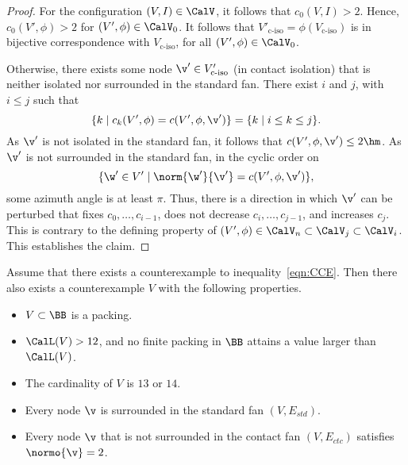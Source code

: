 \begin{proof}
For the configuration $(V,I)\in \CalV$, it follows that $c_0(V,I) >2$.
Hence, $c_0(V',\phi)>2$ for $(V',\phi)\in\CalV_0$.  It follows
that $V'_{\text{c-iso}}=\phi(V_{\text{c-iso}})$ is in bijective correspondence with
$V_{\text{c-iso}}$, for all $(V',\phi)\in \CalV_0$.

Otherwise, there exists some node $\v'\in V'_{\text{c-iso}}$ (in contact
isolation) that is neither isolated nor surrounded in the standard fan.
There exist $i$ and $j$, with $i\le j$ such that
\begin{displaymath}
\{k\mid c_k(V',\phi) = c(V',\phi,\v')\} = \{k\mid i\le k\le j\}.
\end{displaymath}
As $\v'$ is not isolated in the standard fan, it
follows that $c(V',\phi,\v') \le 2\hm$.  As $\v'$ is not surrounded in the
standard fan, in the cyclic order on
\begin{displaymath}
\{\w'\in V' \mid \norm{\w'}{\v'} = c(V',\phi,\v')\},
\end{displaymath}
some azimuth angle is at least $\pi$.
Thus, there is a direction in which $\v'$ can be perturbed
that  fixes $c_0,\ldots,c_{i-1}$, does not decrease $c_i,\ldots,c_{j-1}$, and increases $c_j$.
This is contrary to the defining property of
$(V',\phi)\in\CalV_n\subset\CalV_j\subset\CalV_i$.  This establishes the claim.
\end{proof}



\begin{lemma}[]\label{lemma:CE} 
  Assume that there exists a counterexample to
  inequality~\ref{eqn:CCE}.  Then there also exists a counterexample
  $V$ with the following properties.
\begin{itemize}
\item $V\subset \BB$ is a packing.
\item $\CalL(V) > 12$, and no finite packing in $\BB$ attains a value
  larger than $\CalL(V)$.
\item The cardinality of $V$ is $13$ or $14$.
\item Every node $\v$ is surrounded in the standard fan $(V,E_{std})$.
\item Every node $\v$ that is not surrounded in the contact fan $(V,E_{ctc})$ satisfies $\normo{\v}=2$.
\end{itemize}
\end{lemma}

